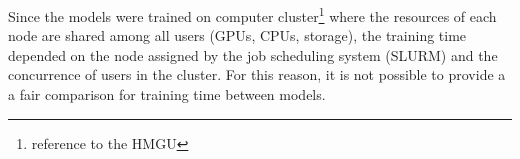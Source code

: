 
\glsresetall
\graphicspath{{./Sections/Results/Resources/}}

Since the models were trained on computer cluster\footnote{reference to the HMGU} where the resources of each node are shared among all users (GPUs, CPUs, storage), the training time depended on the node assigned by the job scheduling system (SLURM) and the concurrence of users in the cluster. For this reason, it is not possible to provide a a fair comparison for training time between models.
